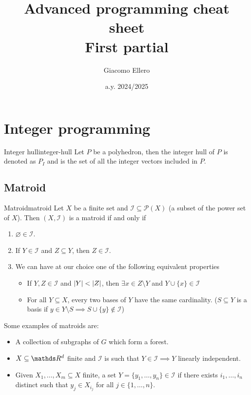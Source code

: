 \documentclass[12pt]{extarticle}
\title{Advanced programming cheat sheet\\First partial}
\author{Giacomo Ellero}
\date{a.y. 2024/2025}
\numberwithin{equation}{subsection}
\begin{document}
\oldfirstpage

\section{Integer programming}

\begin{definition}{Integer hull}{integer-hull}
	Let $P$ be a polyhedron, then the integer hull of $P$ is denoted as $P_I$ and is the set of all
	the integer vectors included in $P$.
\end{definition}

\subsection{Matroid}

\begin{definition}{Matroid}{matroid}
	Let $X$ be a finite set and $\mathcal I \subseteq \mathcal P(X)$ (a subset of the power set of
	$X$). Then $(X, \mathcal I)$ is a matroid if and only if
	\begin{enumerate}
		\item $\varnothing \in \mathcal I$.
		\item If $Y \in \mathcal I$ and $Z \subseteq Y$, then $Z \in \mathcal I$.
		\item We can have at our choice one of the following equivalent properties
		      \begin{itemize}
			      \item If $Y, Z \in \mathcal I$ and $\abs{Y} < \abs{Z}$, then
			            $\exists x \in Z \setminus Y$ and $Y \cup \{x\} \in \mathcal I$
			      \item For all $Y \subseteq X$, every two bases of $Y$ have the same cardinality.
			            ($S \subseteq Y$ is a basis if
			            $y \in Y \setminus S \implies S \cup \{y\} \notin \mathcal I$)
		      \end{itemize}
	\end{enumerate}
\end{definition}

Some examples of matroids are:
\begin{itemize}
	\item A collection of subgraphs of $G$ which form a forest.
	\item $X \subseteq \R^d$ finite and $\mathcal I$ is such that $Y \in \mathcal I \implies Y$
	      linearly independent.
	\item Given $X_1, \dots, X_m \subseteq X$ finite, a set $Y = \{y_1, \dots, y_n \} \in \mathcal I$
	      if there exists $i_1, \dots, i_n$ distinct such that $y_j \in X_{i_j}$ for all
	      $j \in \{1, \dots, n\}$.
\end{itemize}
\end{document}
